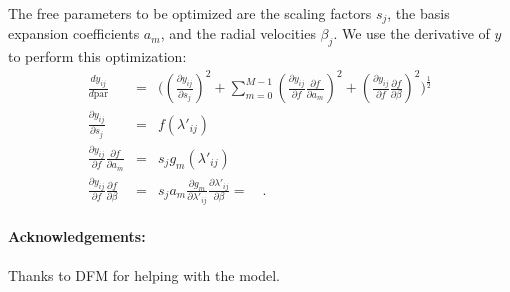 \documentclass[12pt, letterpaper]{article}
\begin{document}
The free parameters to be optimized are the scaling factors $s_j$, the basis expansion
coefficients $a_m$, and the radial velocities $\beta_j$. We use the derivative of 
$y$ to perform this optimization:
\begin{eqnarray}
   \frac{dy_{ij}}{d \mathrm{par}} &=& \Big((\frac{\partial y_{ij}}{\partial s_j})^2 + 
   \sum_{m=0}^{M-1}(\frac{\partial y_{ij}}{\partial f} \frac{\partial f}{\partial a_m})^2 + 
  (\frac{\partial y_{ij}}{\partial f} \frac{\partial f}{\partial \beta})^2\Big)^{\frac{1}{2}}
  \\
  \frac{\partial y_{ij}}{\partial s_j} &=& f(\lambda'_{ij})
  \\
  \frac{\partial y_{ij}}{\partial f} \frac{\partial f}{\partial a_m} &=& s_j g_m(\lambda'_{ij})
  \\
  \frac{\partial y_{ij}}{\partial f} \frac{\partial f}{\partial \beta} &=& s_j a_m \frac{\partial g_m}{\partial \lambda'_{ij}}
  \frac{\partial \lambda'_{ij}}{\partial \beta} = 
  \quad . 
\end{eqnarray}


\paragraph{Acknowledgements:}
Thanks to DFM for helping with the model.
\end{document}
